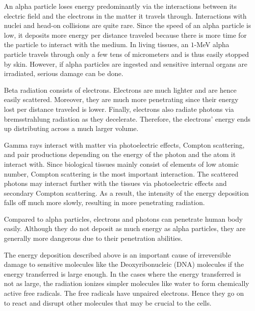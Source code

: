 \documentclass[nofootinbib,preprint,aps]{revtex4-1}
\begin{document}
        An alpha particle loses energy predominantly via the interactions between its electric
        field and the electrons in the matter it travels through. Interactions with nuclei and head-on collisions
        are quite rare. Since the speed of an alpha particle is low, it deposits more energy per distance traveled
        because there is more time for the particle to interact with the medium.
        In living tissues, an $1$-MeV alpha particle travels through only a few tens of micrometers and
        is thus easily stopped by skin. However, if alpha particles are ingested and sensitive internal organs are irradiated,
        serious damage can be done.

        Beta radiation consists of electrons. Electrons are much lighter and are hence easily scattered.
        Moreover, they are much more penetrating since their energy lost per distance traveled is lower.
        Finally, electrons also radiate photons
        via bremsstrahlung radiation as they decelerate. Therefore, the electrons' energy ends up distributing
        across a much larger volume.

        Gamma rays interact with matter via photoelectric effects, Compton scattering, and pair productions
        depending on the energy of the photon and the atom it interact with.
        Since biological tissues mainly consist of elements of low atomic number, Compton
        scattering is the most important interaction. The scattered photons may interact further with the tissues
        via photoelectric effects and secondary Compton scattering. As a result, the intensity of the energy deposition falls
        off much more slowly, resulting in more penetrating radiation.
        
        Compared to alpha particles, electrons and photons can penetrate human body easily.
        Although they do not deposit as much energy as alpha particles, they are generally more dangerous due to their
        penetration abilities.

        The energy deposition described above is an important cause of irreversible damage to sensitive molecules
        like the Deoxyribonucleic (DNA) molecules if the energy transferred is large enough.
        In the cases where the energy transferred is not as large, the radiation ionizes simpler molecules like water
        to form chemically active free radicals. The free radicals have unpaired electrons. Hence they go on to react
        and disrupt
        other molecules that may be crucial to the cells.
\end{document}
